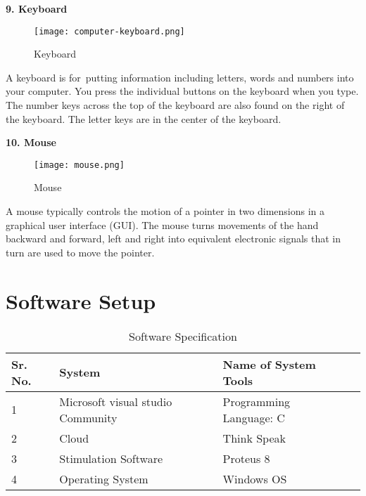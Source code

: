 \documentclass[12pt,a4paper]{report}
\begin{document}
\noindent 

\newpage
\noindent\textbf{9. Keyboard}

\begin{figure}[htp]
    \texttt{[image: computer-keyboard.png]}
    \caption{ Keyboard }
\end{figure}
\noindent A keyboard is for~putting information including letters, words and numbers into your computer. You press the individual buttons on the keyboard when you type. The number keys across the top of the keyboard are also found on the right of the keyboard. The letter keys are in the center of the keyboard.

\noindent 


\noindent\textbf{10. Mouse}

\begin{figure}[htp]
    \texttt{[image: mouse.png]}
    \caption{ Mouse }
\end{figure}



\noindent A mouse typically controls the motion of a pointer in two dimensions in a graphical user interface (GUI). The mouse turns movements of the hand backward and forward, left and right into equivalent electronic signals that in turn are used to move the pointer.

\noindent \textbf{}

\noindent \textbf{}

\newpage
\section{ Software Setup }
\begin{table}[ht]
    \centering
    \resizebox{\textwidth}{!}
    {
\begin{tabular}{|p{0.6in}|p{1.9in}|p{1.7in}|p{0.1in}|} \hline 
\textbf{Sr. No. } & \textbf{System} & \textbf{Name of System Tools} &  \\ \hline 
1 & Microsoft visual studio \newline Community  & Programming Language: C &  \\ \hline 
2 & Cloud  & Think Speak  &  \\ \hline 
3 &  Stimulation Software  & Proteus 8  &  \\ \hline 
4 & Operating System  & Windows OS &  \\ \hline 
\end{tabular}
}
    \caption{Software Specification}
    \label{tab:my_label}
\end{table}
\end{document}
